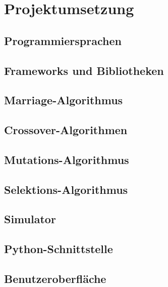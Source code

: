 
\section{Projektumsetzung}

\subsection{Programmiersprachen}

\subsection{Frameworks und Bibliotheken}

\subsection{Marriage-Algorithmus}

\subsection{Crossover-Algorithmen}

\subsection{Mutations-Algorithmus}

\subsection{Selektions-Algorithmus}

\subsection{Simulator}

\subsection{Python-Schnittstelle}

\subsection{Benutzeroberfläche}

